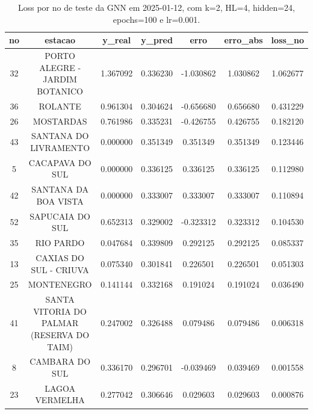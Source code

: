 \begin{table}[h]
\centering
\caption{Loss por no de teste da GNN em 2025-01-12, com k=2, HL=4, hidden=24, epochs=100 e lr=0.001.}
\label{tab:gnn_loss_k2_hl4_h24_e100_d20250112}
\begin{tabular}{ccccccc}
\toprule
no & estacao & y\_real & y\_pred & erro & erro\_abs & loss\_no \\
\midrule
32 & PORTO ALEGRE - JARDIM BOTANICO & 1.367092 & 0.336230 & -1.030862 & 1.030862 & 1.062677 \\
36 & ROLANTE & 0.961304 & 0.304624 & -0.656680 & 0.656680 & 0.431229 \\
26 & MOSTARDAS & 0.761986 & 0.335231 & -0.426755 & 0.426755 & 0.182120 \\
43 & SANTANA DO LIVRAMENTO & 0.000000 & 0.351349 & 0.351349 & 0.351349 & 0.123446 \\
5 & CACAPAVA DO SUL & 0.000000 & 0.336125 & 0.336125 & 0.336125 & 0.112980 \\
42 & SANTANA DA BOA VISTA & 0.000000 & 0.333007 & 0.333007 & 0.333007 & 0.110894 \\
52 & SAPUCAIA DO SUL & 0.652313 & 0.329002 & -0.323312 & 0.323312 & 0.104530 \\
35 & RIO PARDO & 0.047684 & 0.339809 & 0.292125 & 0.292125 & 0.085337 \\
13 & CAXIAS DO SUL - CRIUVA & 0.075340 & 0.301841 & 0.226501 & 0.226501 & 0.051303 \\
25 & MONTENEGRO & 0.141144 & 0.332168 & 0.191024 & 0.191024 & 0.036490 \\
41 & SANTA VITORIA DO PALMAR (RESERVA DO TAIM) & 0.247002 & 0.326488 & 0.079486 & 0.079486 & 0.006318 \\
8 & CAMBARA DO SUL & 0.336170 & 0.296701 & -0.039469 & 0.039469 & 0.001558 \\
23 & LAGOA VERMELHA & 0.277042 & 0.306646 & 0.029603 & 0.029603 & 0.000876 \\
\bottomrule
\end{tabular}
\end{table}
